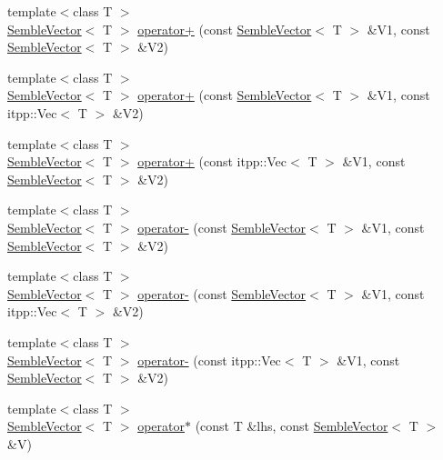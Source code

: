 \begin{DoxyCompactItemize}
{\footnotesize template$<$class T $>$ }\\\mbox{\hyperlink{structSEMBLE_1_1SembleVector}{Semble\+Vector}}$<$ T $>$ \mbox{\hyperlink{namespaceSEMBLE_a3ae3713dc6f7ef13ce32f649e742e3ea}{operator+}} (const \mbox{\hyperlink{structSEMBLE_1_1SembleVector}{Semble\+Vector}}$<$ T $>$ \&V1, const \mbox{\hyperlink{structSEMBLE_1_1SembleVector}{Semble\+Vector}}$<$ T $>$ \&V2)
\item 
{\footnotesize template$<$class T $>$ }\\\mbox{\hyperlink{structSEMBLE_1_1SembleVector}{Semble\+Vector}}$<$ T $>$ \mbox{\hyperlink{namespaceSEMBLE_a658a80a09f4330c5ee6f74ce0577539a}{operator+}} (const \mbox{\hyperlink{structSEMBLE_1_1SembleVector}{Semble\+Vector}}$<$ T $>$ \&V1, const itpp\+::\+Vec$<$ T $>$ \&V2)
\item 
{\footnotesize template$<$class T $>$ }\\\mbox{\hyperlink{structSEMBLE_1_1SembleVector}{Semble\+Vector}}$<$ T $>$ \mbox{\hyperlink{namespaceSEMBLE_a303a3a629ed9e04ceeae416ecaf0111f}{operator+}} (const itpp\+::\+Vec$<$ T $>$ \&V1, const \mbox{\hyperlink{structSEMBLE_1_1SembleVector}{Semble\+Vector}}$<$ T $>$ \&V2)
\item 
{\footnotesize template$<$class T $>$ }\\\mbox{\hyperlink{structSEMBLE_1_1SembleVector}{Semble\+Vector}}$<$ T $>$ \mbox{\hyperlink{namespaceSEMBLE_af31d4baafe49e2d53b7ac9a1dac455d9}{operator-\/}} (const \mbox{\hyperlink{structSEMBLE_1_1SembleVector}{Semble\+Vector}}$<$ T $>$ \&V1, const \mbox{\hyperlink{structSEMBLE_1_1SembleVector}{Semble\+Vector}}$<$ T $>$ \&V2)
\item 
{\footnotesize template$<$class T $>$ }\\\mbox{\hyperlink{structSEMBLE_1_1SembleVector}{Semble\+Vector}}$<$ T $>$ \mbox{\hyperlink{namespaceSEMBLE_a3a4c3290eef6f14585e4ce4f8a2109f5}{operator-\/}} (const \mbox{\hyperlink{structSEMBLE_1_1SembleVector}{Semble\+Vector}}$<$ T $>$ \&V1, const itpp\+::\+Vec$<$ T $>$ \&V2)
\item 
{\footnotesize template$<$class T $>$ }\\\mbox{\hyperlink{structSEMBLE_1_1SembleVector}{Semble\+Vector}}$<$ T $>$ \mbox{\hyperlink{namespaceSEMBLE_aa198a856a86831d5093cdcaff2fd6d4d}{operator-\/}} (const itpp\+::\+Vec$<$ T $>$ \&V1, const \mbox{\hyperlink{structSEMBLE_1_1SembleVector}{Semble\+Vector}}$<$ T $>$ \&V2)
\item 
{\footnotesize template$<$class T $>$ }\\\mbox{\hyperlink{structSEMBLE_1_1SembleVector}{Semble\+Vector}}$<$ T $>$ \mbox{\hyperlink{namespaceSEMBLE_aa71efe4d36f073316935eb894fa8f60e}{operator$\ast$}} (const T \&lhs, const \mbox{\hyperlink{structSEMBLE_1_1SembleVector}{Semble\+Vector}}$<$ T $>$ \&V)

\end{DoxyCompactItemize}

